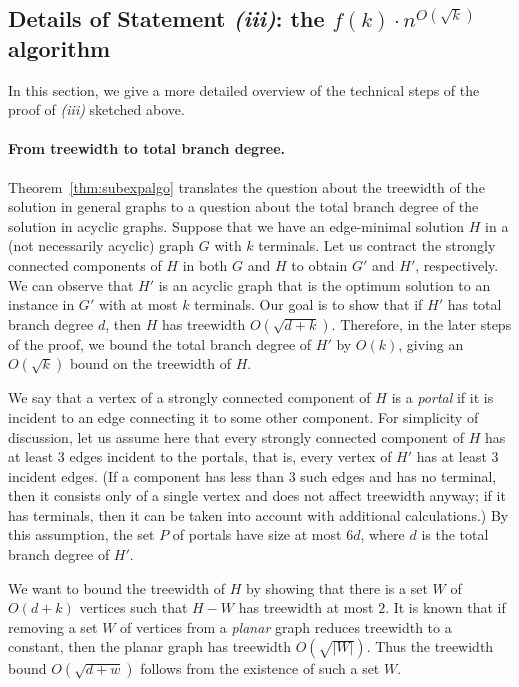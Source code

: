 \subsection{Details of Statement \textit{(iii)}: the $f(k) \cdot n^{O(\sqrt{k})}$ algorithm}
In this section, we give a more detailed overview of the technical steps of the proof of \textit{(iii)} sketched above.

  \paragraph{From treewidth to total branch degree.} Theorem~\ref{thm:subexpalgo} translates the question about the treewidth of the solution in general graphs to a question about the total branch degree of the solution in acyclic graphs. Suppose that we have an edge-minimal solution $H$ in a (not necessarily acyclic) graph $G$ with $k$ terminals. Let us contract the strongly connected components of $H$ in both $G$ and $H$ to obtain $G'$ and $H'$, respectively. We can observe that $H'$ is an acyclic graph that is the optimum solution to an instance in $G'$ with at most $k$ terminals. Our goal is to show that if $H'$ has total branch degree $d$, then $H$ has treewidth $O(\sqrt{d+k})$. Therefore, in the later steps of the proof, we bound the total branch degree of $H'$ by $O(k)$, giving an $O(\sqrt{k})$ bound on the treewidth of $H$.

  We say that a vertex of a strongly connected component of $H$ is a \emph{portal} if it is incident to an edge connecting it to some other component.
  For simplicity of discussion, let us assume here that every strongly connected component of $H$ has at least 3 edges incident to the portals, that is, every vertex of $H'$ has at least 3 incident edges. (If a component has less than 3 such edges and has no terminal, then it consists only of a single vertex and does not affect treewidth anyway; if it has terminals, then it can be taken into account with additional calculations.) By this assumption, the set $P$ of portals have size at most $6d$, where $d$ is the total branch degree of $H'$.

  We want to bound the treewidth of $H$ by showing that there is a set $W$ of $O(d+k)$ vertices such that $H-W$ has treewidth at most $2$. It is known that if removing a set $W$ of vertices from a \emph{planar} graph reduces treewidth to a constant, then the planar graph has treewidth $O(\sqrt{|W|})$. Thus the treewidth bound $O(\sqrt{d+w})$ follows from the existence of such a set $W$.
  
